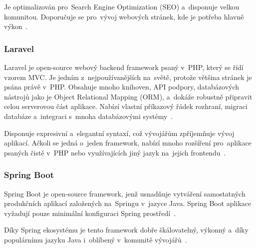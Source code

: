 \documentclass[twoside]{ctuthesis}
\begin{document}
Je optimalizován pro~Search Engine Optimization (SEO) a~disponuje velkou komunitou. Doporučuje se pro~vývoj webových stránek, kde je potřeba hlavně výkon~\cite{radix}.

\subsubsection*{Laravel}

Laravel je open-source webový backend framework psaný v~PHP, který se řídí vzorem MVC. Je jedním z~nejpoužívanějších na~světě, protože většina stránek je psána právě v~PHP. Obsahuje mnoho knihoven, API podpory, databázových nástrojů jako je Object Relational Mapping (ORM), a~dokáže robustně připravit celou serverovou část aplikace. Nabízí vlastní příkazový řádek rozhraní, migraci databáze a~integraci s~mnoha databázovými systémy~\cite{radix, frameworks}. 

Disponuje expresivní a~elegantní syntaxí, což vývojářům zpříjemňuje vývoj aplikací. Ačkoli se jedná o~jeden framework, nabízí mnoho rozšíření pro~aplikace psaných čistě v~PHP nebo využívajících jiný jazyk na~jejich frontendu~\cite{laravel}.
%
%
%

\subsubsection*{Spring Boot}

Spring Boot je open-source framework, jenž usnadňuje vytváření samostatných produkčních aplikací založených na~Springu v~jazyce Java. Spring Boot aplikace vyžadují pouze minimální konfiguraci Spring prostředí~\cite{springboot, medium}. 

Díky Spring ekosystému je tento framework dobře škálovatelný, výkonný a~díky populárnímu jazyku Java i~oblíbený v~komunitě vývojářů~\cite{radix}. 
\end{document}
